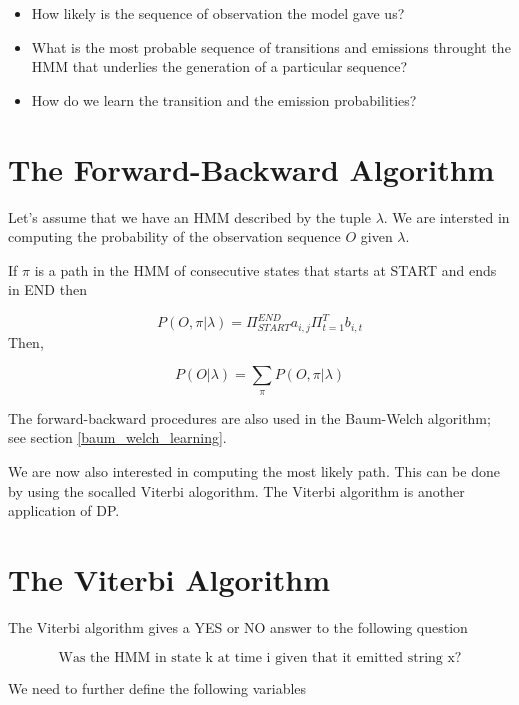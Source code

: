 \begin{itemize}
\item How likely is the sequence of observation the model gave us? 
\item What is the most probable sequence of transitions and emissions  throught the HMM that underlies the 
generation of a particular sequence?
\item How do we learn the transition and the emission probabilities?
\end{itemize}

\section{The Forward-Backward Algorithm}
\label{forward_backward_algo}

Let's assume that we have an HMM described by the tuple $\lambda$. We are intersted in computing the 
probability of the observation sequence $O$ given $\lambda$.

If $\pi$ is a path in the HMM of consecutive states that starts at START and ends in END then

\begin{equation}
P(O, \pi | \lambda) = \Pi_{START}^{END}a_{i,j}\Pi_{t=1}^{T}b_{i,t}
\end{equation}
Then,

\begin{equation}
P(O | \lambda) = \sum_{\pi}P(O, \pi | \lambda)
\end{equation}

The forward-backward procedures are also used in the Baum-Welch algorithm; see section \ref{baum_welch_learning}. 

We are now also interested in computing the most likely path. This can be done by using the socalled Viterbi alogorithm.
The Viterbi algorithm is another application of DP.


\section{The Viterbi Algorithm}
\label{viterbi_algorithm}

The Viterbi algorithm gives a YES or NO answer to the following question

\begin{equation}
\text{Was the HMM in state k at time i given that it emitted string x?}
\end{equation}

We need to further define the following variables

